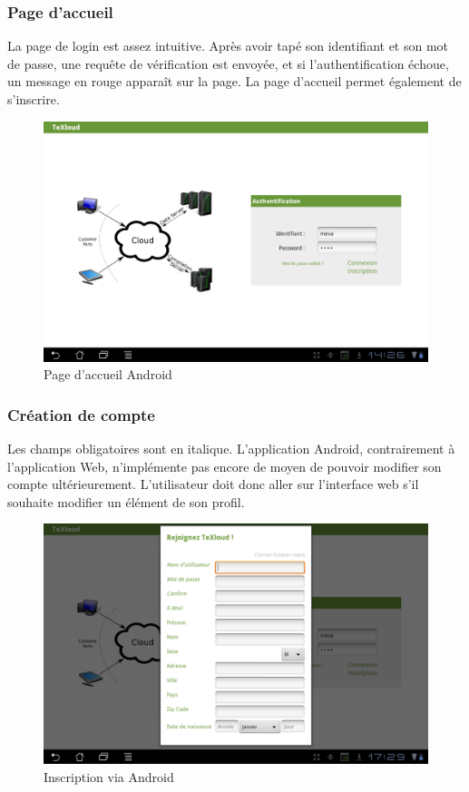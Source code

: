 \documentclass[a4paper,12pt]{article}
\begin{document}
\subsubsection{Page d'accueil}
\bigskip
La page de login est assez intuitive. Après avoir tapé son identifiant et son mot de passe, une requête de vérification est envoyée, et si l'authentification échoue, un message en rouge apparaît sur la page. La page d'accueil permet également de s'inscrire.
\begin{figure}[!ht]
\begin{center}
  \includegraphics[width=1\textwidth]{./images/screenshot/android_accueil.png}
\end{center}
  \caption{Page d'accueil Android}
  \label{Page d'accueil Android}
\end{figure}
\newpage
\subsubsection{Création de compte}
\bigskip
Les champs obligatoires sont en italique. L'application Android, contrairement à l'application Web, n'implémente pas encore de moyen de pouvoir modifier son compte ultérieurement. L'utilisateur doit donc aller sur l'interface web s'il souhaite modifier un 
élément de son profil. 
\begin{figure}[!ht]
\begin{center}
  \includegraphics[width=1\textwidth]{./images/screenshot/inscription_android.png}
\end{center}
  \caption{Inscription via Android}
  \label{Inscription via Android}
\end{figure}
\end{document}
